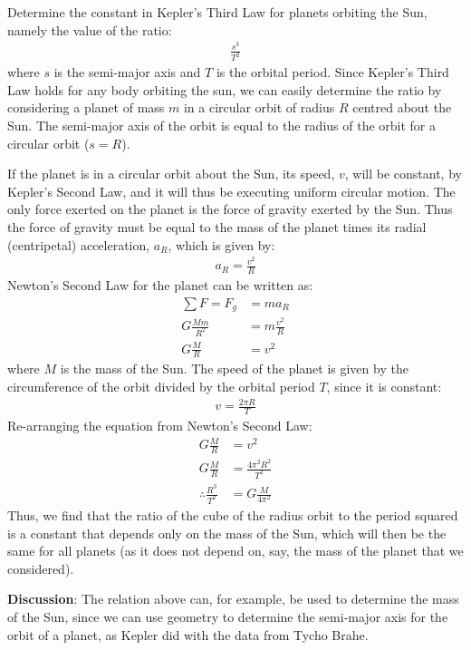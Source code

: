 \begin{example}{\label{ex:gravity:keplerconstant}Determine the constant in Kepler's Third Law for planets orbiting the Sun, namely the value of the ratio:
\begin{align*}
\frac{s^3}{T^2}
\end{align*}
where $s$ is the semi-major axis and $T$ is the orbital period.
}
Since Kepler's Third Law holds for any body orbiting the sun, we can easily determine the ratio by considering a planet of mass $m$ in a circular orbit of radius $R$ centred about the Sun. The semi-major axis of the orbit is equal to the radius of the orbit for a circular orbit ($s=R$).

If the planet is in a circular orbit about the Sun, its speed, $v$, will be constant, by Kepler's Second Law, and it will thus be executing uniform circular motion. The only force exerted on the planet is the force of gravity exerted by the Sun. Thus the force of gravity must be equal to the mass of the planet times its radial (centripetal) acceleration, $a_R$, which is given by:
\begin{align*}
a_R=\frac{v^2}{R}
\end{align*}
Newton's Second Law for the planet can be written as:
\begin{align*}
\sum F = F_g &= ma_R\\
G\frac{Mm}{R^2}&=m\frac{v^2}{R}\\
G\frac{M}{R}&=v^2
\end{align*}
where $M$ is the mass of the Sun. The speed of the planet is given by the circumference of the orbit divided by the orbital period $T$, since it is constant:
\begin{align*}
v=\frac{2\pi R}{T}
\end{align*}
Re-arranging the equation from Newton's Second Law:
\begin{align*}
G\frac{M}{R}&=v^2\\
G\frac{M}{R}&=\frac{4\pi^2 R^2}{T^2}\\
\therefore \frac{R^3}{T^2}&=G\frac{M}{4\pi^2}
\end{align*}
Thus, we find that the ratio of the cube of the radius orbit to the period squared is a constant that depends only on the mass of the Sun, which will then be the same for all planets (as it does not depend on, say, the mass of the planet that we considered).

\textbf{Discussion}: The relation above can, for example, be used to determine the mass of the Sun, since we can use geometry to determine the semi-major axis for the orbit of a planet, as Kepler did with the data from Tycho Brahe.
\end{example}

